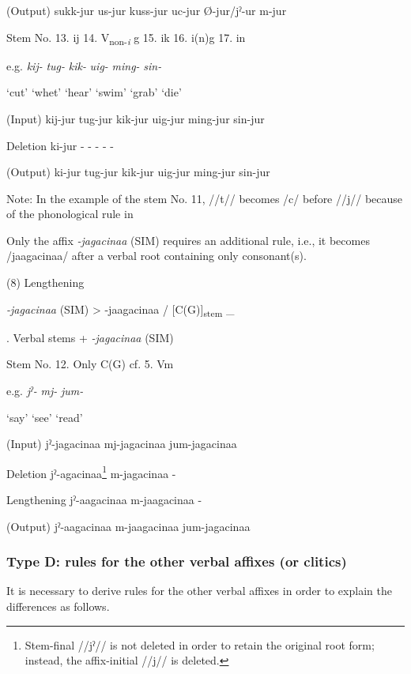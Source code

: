 (Output)  sukk-jur  us-jur  kuss-jur  uc{}-jur  Ø-jur/jˀ-ur  m-jur

Stem No.  13. ij  14. V\textsubscript{non-}\textit{\textsubscript{i}} g  15. ik  16. i(n)g    17. in

e.g.  \textit{kij-}  \textit{tug-}  \textit{kik-}  \textit{uig-}  \textit{ming-}  \textit{sin-}

  ‘cut’  ‘whet’  ‘hear’  ‘swim’  ‘grab’  ‘die’

(Input)  kij-jur  tug-jur  kik-jur  uig-jur  ming-jur  sin-jur

Deletion  ki-jur  {}-  {}-  {}-  {}-  {}-

(Output)  ki-jur  tug-jur  kik-jur  uig-jur  ming-jur  sin-jur

Note: In the example of the stem No. 11, //t// becomes /c/ before //j// because of the phonological rule in 

Only the affix \textit{{}-jagacinaa} (SIM) requires an additional rule, i.e., it becomes /jaagacinaa/ after a verbal root containing only consonant(s).

(8)  Lengthening

  \textit{{}-jagacinaa} (SIM)  >  {}-jaagacinaa  /  [C(G)]\textsubscript{stem}  \_

\begin{styleBeschriftung}
\textmd{. Verbal stems +} \textmd{\textit{{}-jagacinaa}}\textmd{ (SIM)}
\end{styleBeschriftung}

Stem No.  12. Only C(G)    cf.  5. Vm

e.g.  \textit{jˀ-}  \textit{mj-}      \textit{jum-}

  ‘say’  ‘see’      ‘read’

(Input)  jˀ-jagacinaa  mj-jagacinaa      jum-jagacinaa

Deletion  jˀ-agacinaa\footnote{Stem-final //jˀ// is not deleted in order to retain the original root form; instead, the affix-initial //j// is deleted.}  m-jagacinaa      {}-

Lengthening  jˀ-aagacinaa  m-jaagacinaa      {}-

(Output)  jˀ-aagacinaa  m-jaagacinaa      jum-jagacinaa

\subsubsection{Type D: rules for the other verbal affixes (or clitics)}
\label{bkm:Ref347177096}
It is necessary to derive rules for the other verbal affixes in order to explain the differences as follows.

